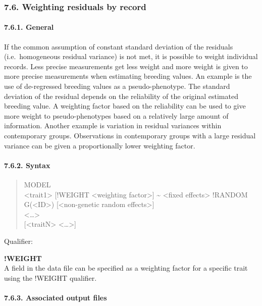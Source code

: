 \subsubsection{7.6. Weighting residuals by record}\label{Stat29}

\paragraph{7.6.1. General}\label{Stat30}

If the common assumption of constant standard deviation of the residuals
(i.e.~homogeneous residual variance) is not met, it is possible to
weight individual records. Less precise measurements get less weight and
more weight is given to more precise measurements when estimating
breeding values. An example is the use of de-regressed breeding values
as a pseudo-phenotype. The standard deviation of the residual depends on
the reliability of the original estimated breeding value. A weighting
factor based on the reliability can be used to give more weight to
pseudo-phenotypes based on a relatively large amount of information.
Another example is variation in residual variances within contemporary
groups. Observations in contemporary groups with a large residual
variance can be given a proportionally lower weighting factor.

\paragraph{7.6.2. Syntax}\label{Stat31}

\begin{quote}
MODEL\\
\textless trait1\textgreater{} {[}!WEIGHT \textless weighting
factor\textgreater{]} \textasciitilde{} \textless fixed
effects\textgreater{} !RANDOM G(\textless ID\textgreater)
{[}\textless non-genetic random effects\textgreater{]}\\
\textless\ldots\textgreater{}\\
{[}\textless traitN\textgreater{} \textless\ldots\textgreater{]}
\end{quote}

Qualifier:

\textbf{!WEIGHT}\\
A field in the data file can be specified as a weighting factor for a
specific trait using the !WEIGHT qualifier.

\paragraph{7.6.3. Associated output files}\label{Stat32}

